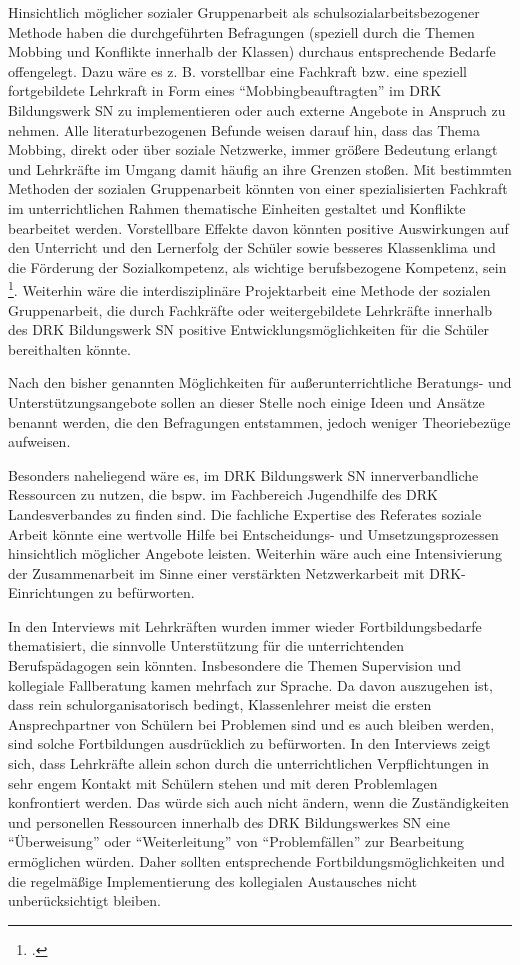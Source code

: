 Hinsichtlich möglicher sozialer Gruppenarbeit als schulsozialarbeitsbezogener Methode haben die durchgeführten Befragungen (speziell durch die Themen Mobbing und Konflikte innerhalb der Klassen) durchaus entsprechende Bedarfe offengelegt. Dazu wäre es z. B. vorstellbar eine Fachkraft bzw. eine speziell fortgebildete Lehrkraft in Form eines "`Mobbingbeauftragten"' im DRK Bildungswerk SN zu implementieren oder auch externe Angebote in Anspruch zu nehmen. Alle literaturbezogenen Befunde weisen darauf hin, dass das Thema Mobbing, direkt oder über soziale Netzwerke, immer größere Bedeutung erlangt und Lehrkräfte im Umgang damit häufig an ihre Grenzen stoßen. Mit bestimmten Methoden der sozialen Gruppenarbeit könnten von einer spezialisierten Fachkraft im unterrichtlichen Rahmen thematische Einheiten gestaltet und Konflikte bearbeitet werden. Vorstellbare Effekte davon könnten positive Auswirkungen auf den Unterricht und den Lernerfolg der Schüler sowie besseres Klassenklima und die Förderung der Sozialkompetenz, als wichtige berufsbezogene Kompetenz, sein \footcites[vgl.][51]{Essers2012}[vgl.][20]{NiedersaechsischesKultusministerium2004}. Weiterhin wäre die interdisziplinäre Projektarbeit eine Methode der sozialen Gruppenarbeit, die durch Fachkräfte oder weitergebildete Lehrkräfte innerhalb des DRK Bildungswerk SN positive Entwicklungsmöglichkeiten für die Schüler bereithalten könnte. 

Nach den bisher genannten Möglichkeiten für außerunterrichtliche Beratungs- und Unterstützungsangebote sollen an dieser Stelle noch einige Ideen und Ansätze benannt werden, die den Befragungen entstammen, jedoch weniger Theoriebezüge aufweisen.

Besonders naheliegend wäre es, im DRK Bildungswerk SN innerverbandliche Ressourcen zu nutzen, die bspw. im Fachbereich Jugendhilfe des DRK Landesverbandes zu finden sind. Die fachliche Expertise des Referates soziale Arbeit könnte eine wertvolle Hilfe bei Entscheidungs- und Umsetzungsprozessen hinsichtlich möglicher Angebote leisten. Weiterhin wäre auch eine Intensivierung der Zusammenarbeit im Sinne einer verstärkten Netzwerkarbeit mit DRK-Einrichtungen zu befürworten. 

In den Interviews mit Lehrkräften wurden immer wieder Fortbildungsbedarfe thematisiert, die sinnvolle Unterstützung für die unterrichtenden Berufspädagogen sein könnten. Insbesondere die Themen Supervision und kollegiale Fallberatung kamen mehrfach zur Sprache. Da davon auszugehen ist, dass rein schulorganisatorisch bedingt, Klassenlehrer meist die ersten Ansprechpartner von Schülern bei Problemen sind und es auch bleiben werden, sind solche Fortbildungen ausdrücklich zu befürworten. In den Interviews zeigt sich, dass Lehrkräfte allein schon durch die unterrichtlichen Verpflichtungen in sehr engem Kontakt mit Schülern stehen und mit deren Problemlagen konfrontiert werden. Das würde sich auch nicht ändern, wenn die Zuständigkeiten und personellen Ressourcen innerhalb des DRK Bildungswerkes SN eine "`Überweisung"' oder "`Weiterleitung"' von "`Problemfällen"' zur Bearbeitung ermöglichen würden. Daher sollten entsprechende Fortbildungsmöglichkeiten und die regelmäßige Implementierung des kollegialen Austausches nicht unberücksichtigt bleiben.

